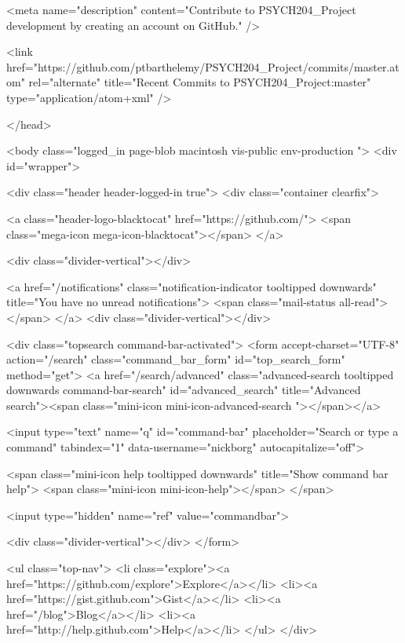     <meta name="description" content="Contribute to PSYCH204_Project development by creating an account on GitHub." />

  <link href="https://github.com/ptbarthelemy/PSYCH204_Project/commits/master.atom" rel="alternate" title="Recent Commits to PSYCH204_Project:master" type="application/atom+xml" />

  </head>


  <body class="logged_in page-blob macintosh vis-public env-production ">
    <div id="wrapper">

      

      

      


        <div class="header header-logged-in true">
          <div class="container clearfix">

            <a class="header-logo-blacktocat" href="https://github.com/">
  <span class="mega-icon mega-icon-blacktocat"></span>
</a>

            <div class="divider-vertical"></div>

              <a href="/notifications" class="notification-indicator tooltipped downwards" title="You have no unread notifications">
    <span class="mail-status all-read"></span>
  </a>
  <div class="divider-vertical"></div>


              
  <div class="topsearch command-bar-activated">
    <form accept-charset="UTF-8" action="/search" class="command_bar_form" id="top_search_form" method="get">
  <a href="/search/advanced" class="advanced-search tooltipped downwards command-bar-search" id="advanced_search" title="Advanced search"><span class="mini-icon mini-icon-advanced-search "></span></a>

  <input type="text" name="q" id="command-bar" placeholder="Search or type a command" tabindex="1" data-username="nickborg" autocapitalize="off">

  <span class="mini-icon help tooltipped downwards" title="Show command bar help">
    <span class="mini-icon mini-icon-help"></span>
  </span>

  <input type="hidden" name="ref" value="commandbar">

  <div class="divider-vertical"></div>
</form>



    <ul class="top-nav">
        <li class="explore"><a href="https://github.com/explore">Explore</a></li>
        <li><a href="https://gist.github.com">Gist</a></li>
        <li><a href="/blog">Blog</a></li>
      <li><a href="http://help.github.com">Help</a></li>
    </ul>
  </div>


